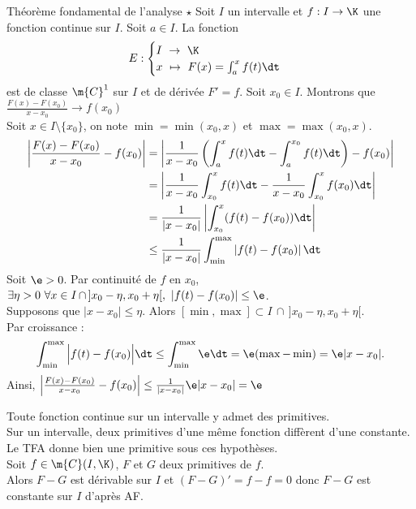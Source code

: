 \documentclass[11pt]{article}
\begin{document}
\begin{thm}{Théorème fondamental de l'analyse $\star$}{}
    Soit $I$ un intervalle et $f:I\to\K$ une fonction continue sur $I$. Soit $a\in I$. La fonction
    \begin{equation*}
        E: \begin{cases}
           I~\to~\K\\
           x~\mapsto~F(x) = \int_a^xf(t)\dt 
        \end{cases}
    \end{equation*}
    est de classe $\m{C}^1$ sur $I$ et de dérivée $F'=f$.
    \tcblower
    Soit $x_0\in I$. Montrons que $\frac{F(x)-F(x_0)}{x-x_0}\to f(x_0)$\\
    Soit $x\in I\setminus\{x_0\}$, on note $\min=\min(x_0,x)$ et $\max=\max(x_0,x)$.
    \begin{align*}
        \left|\frac{F(x)-F(x_0)}{x-x_0}-f(x_0)\right|&=\left|\frac{1}{x-x_0}\left(\int_a^xf(t)\dt-\int_a^{x_0}f(t)\dt\right)-f(x_0)\right|\\
        &=\left|\frac{1}{x-x_0}\int_{x_0}^xf(t)\dt-\frac{1}{x-x_0}\int_{x_0}^xf(x_0)\dt\right|\\
        &=\frac{1}{|x-x_0|}\left|\int_{x_0}^x(f(t)-f(x_0))\dt\right|\\
        &\leq\frac{1}{|x-x_0|}\int_{\min}^{\max}\left|f(t)-f(x_0)\right|\dt
    \end{align*}
    Soit $\e>0$. Par continuité de $f$ en $x_0$, $\exists \eta>0 ~ \forall x \in I\,\cap\,]x_0-\eta,x_0+\eta[,~|f(t)-f(x_0)|\leq\e$.\\
    Supposons que $|x-x_0|\leq\eta$. Alors $[\min, \max]\subset I\,\cap\,]x_0-\eta,x_0+\eta[$.\\
    Par croissance :
    \begin{equation*}
        \int_{\min}^{\max}\Big|f(t)-f(x_0)\Big|\dt\leq\int_{\min}^{\max}\e\dt = \e(\max - \min) = \e|x-x_0|.
    \end{equation*}
    Ainsi, $\Big|\frac{F(x)-F(x_0)}{x-x_0}-f(x_0)\Big|\leq\frac{1}{|x-x_0|}\e|x-x_0|=\e$
\end{thm}

\begin{corr}{}{}
    Toute fonction continue sur un intervalle y admet des primitives.\\
    Sur un intervalle, deux primitives d'une même fonction diffèrent d'une constante.
    \tcblower
    Le TFA donne bien une primitive sous ces hypothèses.\\
    Soit $f\in\m{C}(I,\K)$, $F$ et $G$ deux primitives de $f$.\\
    Alors $F-G$ est dérivable sur $I$ et $(F-G)'=f-f=0$ donc $F-G$ est constante sur $I$ d'après AF.
\end{corr}
\end{document}
